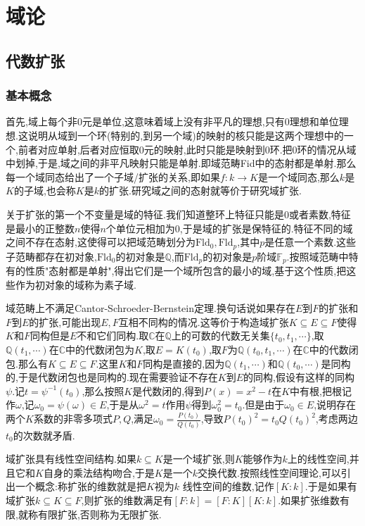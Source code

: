 \chapter{域论}
\section{代数扩张}
\subsection{基本概念}

首先,域上每个非0元是单位,这意味着域上没有非平凡的理想,只有0理想和单位理想.这说明从域到一个环(特别的,到另一个域)的映射的核只能是这两个理想中的一个,前者对应单射,后者对应恒取0元的映射,此时只能是映射到0环.把0环的情况从域中划掉,于是,域之间的非平凡映射只能是单射.即域范畴Fid中的态射都是单射.那么每一个域同态给出了一个子域/扩张的关系,即如果$f:k\to K$是一个域同态,那么$k$是$K$的子域,也会称$K$是$k$的扩张.研究域之间的态射就等价于研究域扩张.

关于扩张的第一个不变量是域的特征.我们知道整环上特征只能是0或者素数,特征是最小的正整数$n$使得$n$个单位元相加为0,于是域的扩张是保特征的.特征不同的域之间不存在态射,这使得可以把域范畴划分为$\mathrm{Fld}_0,\mathrm{Fld}_p$,其中$p$是任意一个素数.这些子范畴都存在初对象,$\mathrm{Fld}_0$的初对象是$\mathbb{Q}$,而$\mathrm{Fld}_p$的初对象是$p$阶域$\mathbb{F}_p$.按照域范畴中特有的性质"态射都是单射",得出它们是一个域所包含的最小的域,基于这个性质,把这些作为初对象的域称为素子域.

域范畴上不满足Cantor-Schroeder-Bernstein定理.换句话说如果存在$E$到$F$的扩张和$F$到$E$的扩张,可能出现$E,F$互相不同构的情况.这等价于构造域扩张$K\subseteq E\subseteq F$使得$K$和$F$同构但是$E$不和它们同构.取$\mathbb{C}$在$\mathbb{Q}$上的可数的代数无关集$\{t_0,t_1,\cdots\}$,取$\mathbb{Q}(t_1,\cdots)$在$\mathbb{C}$中的代数闭包为$K$,取$E=K(t_0)$,取$F$为$\mathbb{Q}(t_0,t_1,\cdots)$在$\mathbb{C}$中的代数闭包.那么有$K\subseteq E\subseteq F$.这里$K$和$F$同构是直接的,因为$\mathbb{Q}(t_1,\cdots)$和$\mathbb{Q}(t_0,\cdots)$是同构的,于是代数闭包也是同构的.现在需要验证不存在$K$到$E$的同构,假设有这样的同构$\psi$.记$t=\psi^{-1}(t_0)$,那么按照$K$是代数闭的,得到$P(x)=x^2-t$在$K$中有根,把根记作$\omega$,记$\omega_0=\psi(\omega)\in E$,于是从$\omega^2=t$作用$\psi$得到$\omega_0^2=t_0$.但是由于$\omega_0\in E$,说明存在两个$K$系数的非零多项式$P,Q$,满足$\omega_0=\frac{P(t_0)}{Q(t_0)}$,导致$P(t_0)^2=t_0Q(t_0)^2$,考虑两边$t_0$的次数就矛盾.

域扩张具有线性空间结构.如果$k\subseteq K$是一个域扩张,则$K$能够作为$k$上的线性空间,并且它和$K$自身的乘法结构吻合,于是$K$是一个$k$交换代数.按照线性空间理论,可以引出一个概念:称扩张的维数就是把$K$视为$k$ 线性空间的维数,记作$[K:k]$.于是如果有域扩张$k\subseteq K\subseteq F$,则扩张的维数满足有$[F:k]=[F:K][K:k]$.如果扩张维数有限,就称有限扩张,否则称为无限扩张.

